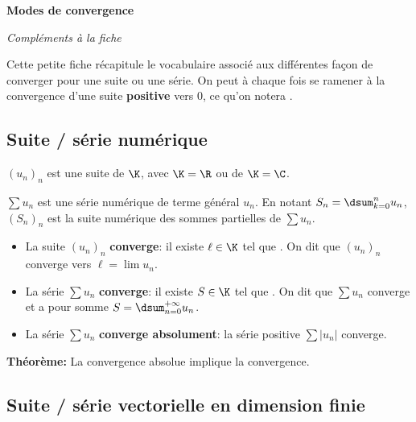  

\begin{center}
\par\textbf{\huge Modes de convergence}
\medskip
\par\textit{\Large Compléments à la fiche \no\thenumRecap}
\bigskip
\end{center}


Cette petite fiche récapitule le vocabulaire associé aux différentes
façon de converger pour une suite ou une série. On peut à chaque fois
se ramener à la convergence d'une suite \textbf{positive} vers $0$, ce qu'on
notera .


\subsection*{Suite / série  numérique}

$(u_n)_n$ est une suite de $\K$, avec $\K=\R$ ou de $\K=\C$.

\smallskip

$\sum
u_n$ est une série numérique de terme général $u_n$. En notant
$S_n=\dsum_{k=0}^nu_n$,
$(S_n)_n$ est la suite numérique des sommes partielles de $\sum u_n$.

\smallskip

\begin{itemize}
  \setlength\itemsep{0.6em}
\item La suite $(u_n)_n$ \textbf{converge}: il existe $\ell\in\K$ tel que
  . On dit que $(u_n)_n$ converge vers
  $\ell=\lim u_n$.
\item La série $\sum u_n$ \textbf{converge}: il existe $S\in\K$ tel que
  . On dit que $\sum u_n$ converge et a pour
  somme $S=\dsum_{n=0}^{+\infty}u_n$.
\item La série $\sum u_n$ \textbf{converge absolument}: la série positive $\sum
  |u_n|$ converge.
\end{itemize}

\smallskip

{\bfseries Théorème:} La convergence absolue implique la convergence.


\subsection*{Suite / série vectorielle en dimension finie}



